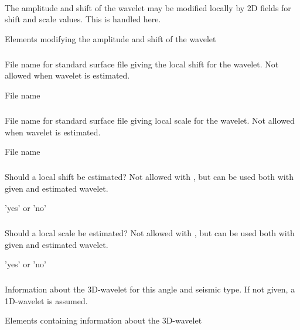 \paragraph{}
 \slist
   \item \Description The amplitude and shift of the wavelet may be modified locally by 2D fields for shift and scale values. This is handled here.
   \item \Argument Elements modifying the amplitude and shift of the wavelet
   \item \Default
 \elist

\subparagraph{}
 \slist
   \item \Description File name for standard surface file giving the local shift for the wavelet. Not allowed when wavelet is estimated.
   \item \Argument File name
   \item \Default
 \elist

\subparagraph{}
 \slist
   \item \Description File name for standard surface file giving local scale for the wavelet. Not allowed when wavelet is estimated.
   \item \Argument File name
   \item \Default
 \elist

\subparagraph{}
 \slist
   \item \Description Should a local shift be estimated? Not allowed with , but can be used both with given and estimated wavelet.
   \item \Argument 'yes' or 'no'
   \item \Default
 \elist

\subparagraph{}
 \slist
   \item \Description Should a local scale be estimated? Not allowed with , but can be used both with given and estimated wavelet.
   \item \Argument 'yes' or 'no'
   \item \Default
 \elist

\subsubsection{}
 \slist
   \item \Description Information about the 3D-wavelet for this angle and seismic type. If not given, a 1D-wavelet is assumed.
   \item \Argument Elements containing information about the 3D-wavelet
   \item \Default
 \elist

